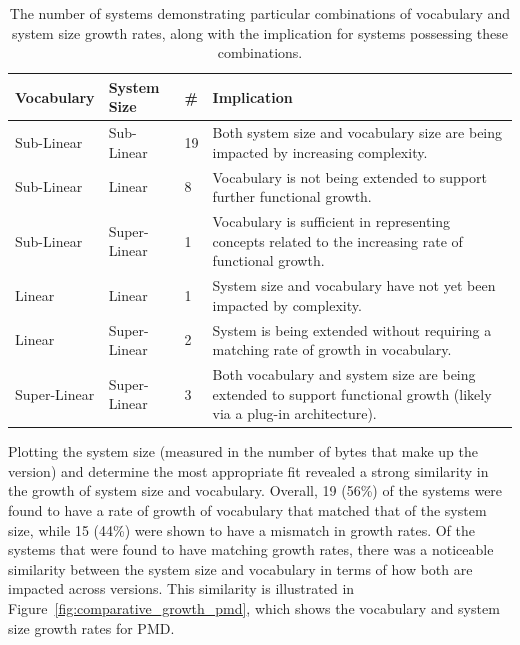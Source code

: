 \begin{table}[t]
\centering
\begin{tabular}{|p{}|p{}|p{}|p{}|}
\hline
{\bf Vocabulary} & {\bf System Size} & {\bf \#} & {\bf Implication} \\
\hline
\hline
Sub-Linear
&
Sub-Linear
&
19
&
Both system size and vocabulary size are being impacted by increasing complexity.
\\
\hline
Sub-Linear
&
Linear
&
8
&
Vocabulary is not being extended to support further functional growth.
\\
\hline
Sub-Linear
&
Super-Linear
&
1
&
Vocabulary is sufficient in representing concepts related to the increasing rate of functional growth.
\\
\hline
Linear
&
Linear
&
1
&
System size and vocabulary have not yet been impacted by complexity.
\\
\hline
Linear
&
Super-Linear
&
2
&
System is being extended without requiring a matching rate of growth in vocabulary.
\\
\hline
Super-Linear
&
Super-Linear
&
3
&
Both vocabulary and system size are being extended to support functional growth (likely via a plug-in architecture).
\\
\hline
\end{tabular}
\vspace{0.2cm}
\caption{The number of systems demonstrating particular combinations of vocabulary and system size growth rates, along with the implication for systems possessing these combinations.}
\label{tab:growth_rate_results}
\vspace{-0.2cm}
\end{table}

Plotting the system size (measured in the number of bytes that make up the version) and determine the most appropriate fit revealed a strong similarity in the growth of system size and vocabulary. Overall, 19 (56\%) of the systems were found to have a rate of growth of vocabulary that matched that of the system size, while 15 (44\%) were shown to have a mismatch in growth rates. Of the systems that were found to have matching growth rates, there was a noticeable similarity between the system size and vocabulary in terms of how both are impacted across versions. This similarity is illustrated in Figure~\ref{fig:comparative_growth_pmd}, which shows the vocabulary and system size growth rates for PMD.

